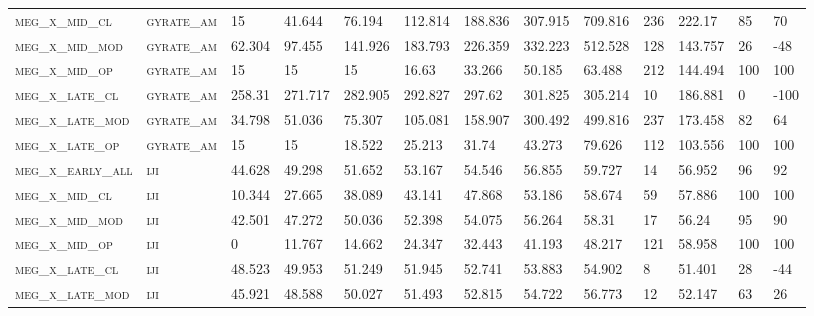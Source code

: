 \begin{landscape}
\begin{center}
\begin{footnotesize}
\begin{longtable}{lllllllllllll}
\textsc{meg\_x\_mid\_cl   } & \textsc{gyrate\_am}   & 15       & 41.644   & 76.194   & 112.814  & 188.836  & 307.915  & 709.816   & 236    & 222.17        & 85            & 70            \\
\textsc{meg\_x\_mid\_mod  } & \textsc{gyrate\_am}   & 62.304   & 97.455   & 141.926  & 183.793  & 226.359  & 332.223  & 512.528   & 128    & 143.757       & 26            & -48           \\
\textsc{meg\_x\_mid\_op   } & \textsc{gyrate\_am}   & 15       & 15       & 15       & 16.63    & 33.266   & 50.185   & 63.488    & 212    & 144.494       & 100           & 100           \\
\textsc{meg\_x\_late\_cl  } & \textsc{gyrate\_am}   & 258.31   & 271.717  & 282.905  & 292.827  & 297.62   & 301.825  & 305.214   & 10     & 186.881       & 0             & -100          \\
\textsc{meg\_x\_late\_mod } & \textsc{gyrate\_am}   & 34.798   & 51.036   & 75.307   & 105.081  & 158.907  & 300.492  & 499.816   & 237    & 173.458       & 82            & 64            \\
\textsc{meg\_x\_late\_op  } & \textsc{gyrate\_am}   & 15       & 15       & 18.522   & 25.213   & 31.74    & 43.273   & 79.626    & 112    & 103.556       & 100           & 100           \\
\textsc{meg\_x\_early\_all} & \textsc{iji       }   & 44.628   & 49.298   & 51.652   & 53.167   & 54.546   & 56.855   & 59.727    & 14     & 56.952        & 96            & 92            \\
\textsc{meg\_x\_mid\_cl   } & \textsc{iji       }   & 10.344   & 27.665   & 38.089   & 43.141   & 47.868   & 53.186   & 58.674    & 59     & 57.886        & 100           & 100           \\
\textsc{meg\_x\_mid\_mod  } & \textsc{iji       }   & 42.501   & 47.272   & 50.036   & 52.398   & 54.075   & 56.264   & 58.31     & 17     & 56.24         & 95            & 90            \\
\textsc{meg\_x\_mid\_op   } & \textsc{iji       }   & 0        & 11.767   & 14.662   & 24.347   & 32.443   & 41.193   & 48.217    & 121    & 58.958        & 100           & 100           \\
\textsc{meg\_x\_late\_cl  } & \textsc{iji       }   & 48.523   & 49.953   & 51.249   & 51.945   & 52.741   & 53.883   & 54.902    & 8      & 51.401        & 28            & -44           \\
\textsc{meg\_x\_late\_mod } & \textsc{iji       }   & 45.921   & 48.588   & 50.027   & 51.493   & 52.815   & 54.722   & 56.773    & 12     & 52.147        & 63            & 26            \\

\end{longtable}
\end{footnotesize}
\end{center}
\end{landscape}
